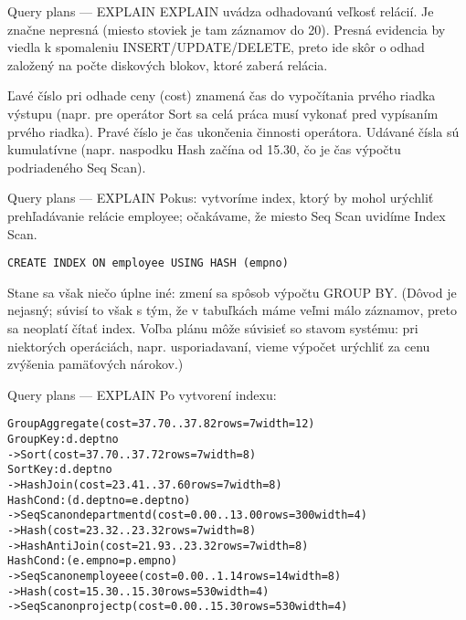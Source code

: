 \documentclass[12pt]{beamer}
\begin{document}
\begin{frame}[fragile]{Query plans --- EXPLAIN}
EXPLAIN uvádza odhadovanú veľkosť relácií. Je značne nepresná (miesto stoviek je tam záznamov do 20).
Presná evidencia by viedla k spomaleniu INSERT/UPDATE/DELETE,
preto ide skôr o odhad založený na počte diskových blokov, ktoré zaberá relácia.
\bigskip

Ľavé číslo pri odhade ceny (cost) znamená čas do vypočítania prvého riadka výstupu
(napr. pre operátor Sort sa celá práca musí vykonať pred vypísaním prvého riadka).
Pravé číslo je čas ukončenia činnosti operátora.
Udávané čísla sú kumulatívne (napr. naspodku Hash začína od 15.30, čo je čas výpočtu podriadeného Seq Scan).
\end{frame}

\begin{frame}[fragile]{Query plans --- EXPLAIN}
Pokus: vytvoríme index, ktorý by mohol urýchliť prehľadávanie relácie employee;
očakávame, že miesto Seq Scan uvidíme Index Scan.
\bigskip

\verb|CREATE INDEX ON employee USING HASH (empno)|
\bigskip

Stane sa však niečo úplne iné: zmení sa spôsob výpočtu GROUP BY.
(Dôvod je nejasný; súvisí to však s tým, že v tabuľkách máme veľmi málo záznamov,
preto sa neoplatí čítať index. Voľba plánu môže súvisieť so stavom systému:
pri niektorých operáciách, napr. usporiadavaní, vieme výpočet urýchliť za cenu zvýšenia pamäťových nárokov.)
\end{frame}

\begin{frame}[fragile]{Query plans --- EXPLAIN}
Po vytvorení indexu:
\scriptsize
\begin{alltt}
  GroupAggregate  (cost=37.70..37.82 rows=7 width=12)
  Group Key: d.deptno
  ->  Sort  (cost=37.70..37.72 rows=7 width=8)
        Sort Key: d.deptno
        ->  Hash Join  (cost=23.41..37.60 rows=7 width=8)
              Hash Cond: (d.deptno = e.deptno)
              ->  Seq Scan on department d  (cost=0.00..13.00 rows=300 width=4)
              ->  Hash  (cost=23.32..23.32 rows=7 width=8)
                    ->  Hash Anti Join  (cost=21.93..23.32 rows=7 width=8)
                          Hash Cond: (e.empno = p.empno)
                          ->  Seq Scan on employee e  (cost=0.00..1.14 rows=14 width=8)
                          ->  Hash  (cost=15.30..15.30 rows=530 width=4)
                                ->  Seq Scan on project p  (cost=0.00..15.30 rows=530 width=4)
\end{alltt}
\end{frame}
\end{document}
